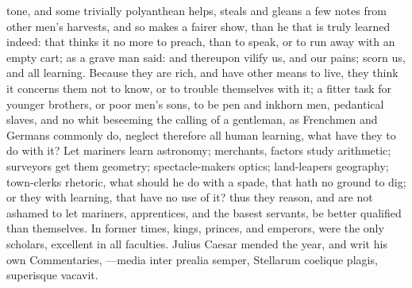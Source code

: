 {tone, and some trivially polyanthean helps, steals and gleans a few
notes from other men's harvests, and so makes a fairer show, than he
that is truly learned indeed: that thinks it no more to preach, than to
speak, or to run away with an empty cart; as a grave man said:
and thereupon vilify us, and our pains; scorn us, and all learning.
 Because they are rich, and have other means to live, they think
it concerns them not to know, or to trouble themselves with it; a
fitter task for younger brothers, or poor men's sons, to be pen and
inkhorn men, pedantical slaves, and no whit beseeming the calling of a
gentleman, as Frenchmen and Germans commonly do, neglect therefore all
human learning, what have they to do with it? Let mariners learn
astronomy; merchants, factors study arithmetic; surveyors get them
geometry; spectacle-makers optics; land-leapers geography; town-clerks
rhetoric, what should he do with a spade, that hath no ground to dig;
or they with learning, that have no use of it? thus they reason, and
are not ashamed to let mariners, apprentices, and the basest servants,
be better qualified than themselves. In former times, kings, princes,
and emperors, were the only scholars, excellent in all faculties.
Julius Caesar mended the year, and writ his own Commentaries,
---media inter prealia semper,
Stellarum coelique plagis, superisque vacavit.

}
